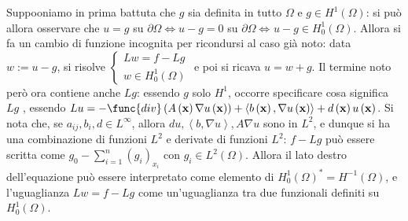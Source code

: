 \documentclass{article}
\begin{document}
Suppooniamo in prima battuta che $g$ sia definita in tutto $\Omega $ e $g\in
H^{1}\left( \Omega \right) $: si pu\`{o} allora osservare che $u=g$ su $%
\partial \Omega \Longleftrightarrow u-g=0$ su $\partial \Omega
\Longleftrightarrow ^{}u-g\in H_{0}^{1}\left( \Omega \right) $.
Allora si fa un cambio di funzione incognita per ricondursi al caso gi\`{a}
noto: data $w:=u-g$, si risolve $\left\{ 
\begin{array}{c}
Lw=f-Lg \\ 
w\in H_{0}^{1}\left( \Omega \right)%
\end{array}%
\right. $ e poi si ricava $u=w+g$. Il termine noto per\`{o} ora contiene
anche $Lg$: essendo $g$ solo $H^{1}$, occorre specificare cosa significa $Lg$%
, essendo $Lu=-\func{div}\left( A\left( \mathbf{x}\right) \nabla u\left( 
\mathbf{x}\right) \right) +\left\langle b\left( \mathbf{x}\right) ,\nabla
u\left( \mathbf{x}\right) \right\rangle +d\left( \mathbf{x}\right) u\left( 
\mathbf{x}\right) $. Si nota che, se $a_{ij},b_{i},d\in L^{\infty }$, allora 
$du,\left\langle b,\nabla u\right\rangle ,A\nabla u$ sono in $L^{2}$, e
dunque si ha una combinazione di funzioni $L^{2}$ e derivate di funzioni $%
L^{2}$: $f-Lg$ pu\`{o} essere scritta come $g_{0}-\sum_{i=1}^{n}\left(
g_{i}\right) _{x_{i}}$ con $g_{i}\in L^{2}\left( \Omega \right) $. Allora il
lato destro dell'equazione pu\`{o} essere interpretato come elemento di $%
H_{0}^{1}\left( \Omega \right) ^{\ast }=H^{-1}\left( \Omega \right) $, e
l'uguaglianza $Lw=f-Lg$ come un'uguaglianza tra due funzionali definiti su $%
H_{0}^{1}\left( \Omega \right) $.
\end{document}
